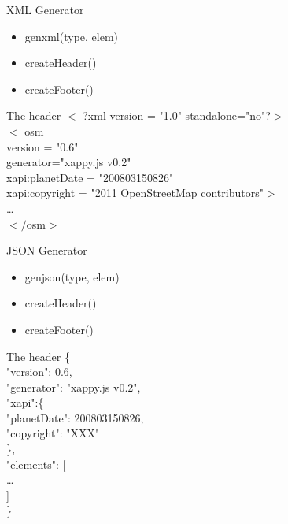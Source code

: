 \documentclass{beamer}
\begin{document}
\begin{frame}{XML Generator}
    \begin{itemize}
        \item genxml(type, elem)
        \item createHeader()
        \item createFooter()
    \end{itemize}

    \begin{block}{The header}
        $<$ ?xml version = "1.0" standalone="no"?$>$ \\
        $<$ osm \\
        version = "0.6" \\
        generator="xappy.js v0.2" \\
        xapi:planetDate = "200803150826"\\
        xapi:copyright = "2011 OpenStreetMap contributors"$>$\\
        \dots\\
        $</$osm$>$
    \end{block}
\end{frame}

\begin{frame}{JSON Generator}
    \begin{itemize}
        \item genjson(type, elem)
        \item createHeader()
        \item createFooter()
    \end{itemize}

    \begin{block}{The header}
        \{\\
            \hspace*{4mm}"version": 0.6,\\
            \hspace*{4mm} "generator": "xappy.js v0.2",\\
            \hspace*{4mm} "xapi":\{\\
            \hspace*{8mm} "planetDate": 200803150826,\\
            \hspace*{8mm} "copyright": "XXX"\\
            \hspace*{4mm} \},\\

            \hspace*{4mm}"elements": [\\
            \hspace*{8mm}\dots\\
            \hspace*{4mm}]\\
            \}
    \end{block}
\end{frame}
\end{document}
